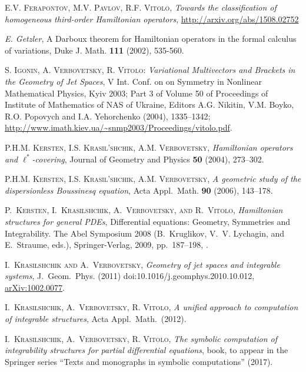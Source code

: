 \begin{thebibliography}{999}
 \textsc{E.V. Ferapontov, M.V. Pavlov, R.F. Vitolo},
\emph{Towards the classification of homogeneous third-order Hamiltonian
  operators}, \url{http://arxiv.org/abs/1508.02752}

 \emph{E. Getzler}, A Darboux theorem for Hamiltonian
operators in the formal calculus of variations, Duke J. Math. \textbf{111}
(2002), 535-560.

\textsc{S. Igonin, A. Verbovetsky, R. Vitolo:}
  \emph{Variational Multivectors and Brackets in the Geometry of Jet Spaces}, V
  Int. Conf. on on Symmetry in Nonlinear Mathematical Physics, Kyiv 2003; Part
  3 of Volume 50 of Proceedings of Institute of Mathematics of NAS of Ukraine,
  Editors A.G.  Nikitin, V.M. Boyko, R.O. Popovych and I.A. Yehorchenko (2004),
  1335--1342; \url{http://www.imath.kiev.ua/~snmp2003/Proceedings/vitolo.pdf}.

 \textsc{P.H.M. Kersten, I.S. Krasil'shchik, A.M. Verbovetsky,}
  \emph{Hamiltonian operators and $\ell^*$-covering}, Journal of Geometry and
  Physics \textbf{50} (2004), 273--302.

 \textsc{P.H.M. Kersten, I.S. Krasil'shchik, A.M. Verbovetsky,}
  \emph{A geometric study of the dispersionless Boussinesq equation}, Acta
  Appl.\ Math. \textbf{90} (2006), 143--178.

 \textsc{P.~Kersten,
  I.~Krasil{\cprime}shchik, A.~Verbovetsky, and R.~Vitolo}, \emph{Hamiltonian
    structures for general {PDE}s}, Differential equations: Geometry,
  Symmetries and Integrability. The Abel Symposium 2008 (B.~Kruglikov,
  V.~V. Lychagin, and E.~Straume, eds.), Springer-Verlag, 2009, pp.~187--198,
  .

 \textsc{I.~Krasil{\cprime}shchik and A.~Verbovetsky},
  \emph{Geometry of jet spaces and integrable systems}, J.\ Geom.\
  Phys. (2011) doi:10.1016/j.geomphys.2010.10.012, \url{arXiv:1002.0077}.

 \textsc{I.~Krasil{\cprime}shchik, A.~Verbovetsky,
    R. Vitolo},  \emph{A unified approach to computation of integrable
    structures}, Acta Appl.\ Math.\ (2012).

 \textsc{I.~Krasil{\cprime}shchik, A.~Verbovetsky,
    R. Vitolo},  \emph{The symbolic computation of integrability structures for
    partial differential equations}, book, to appear in the Springer series
``Texts and monographs in symbolic computations'' (2017).


\end{thebibliography}
